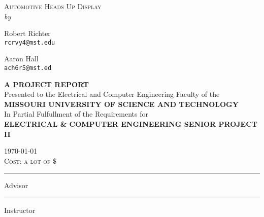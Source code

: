 \begin{titlepage}

\begin{center}
\textsc{\LARGE Automotive Heads Up Display} \\[2cm]

\textit{by} \\[0.5cm]

\begin{multicols}{2}
Robert Richter\\
\texttt{rcrvy4@mst.edu}\\

\columnbreak

Aaron Hall\\
\texttt{ach6r5@mst.ed}
\end{multicols}

\vspace{3 cm}

\textsc{\small \textbf{A PROJECT REPORT}} \\[0.5cm]
{\small Presented to the Electrical and Computer Engineering Faculty of the} \\[0.5cm]
\textsc{\small \textbf{MISSOURI UNIVERSITY OF SCIENCE AND TECHNOLOGY}} \\[0.5cm]
{\small In Partial Fulfullment of the Requirements for} \\[0.5cm]
\textsc{\small \textbf{ELECTRICAL \& COMPUTER ENGINEERING SENIOR PROJECT II}} \\[1cm]

\vfill

\textsc{\today} \\[3mm]
\textsc{Cost: a lot of \$} \\[2cm]

\begin{multicols}{2}
\hrule
\vspace{1mm}
Advisor\\
\columnbreak
\hrule
\vspace{1mm}
Instructor
\end{multicols}

\end{center}
\end{titlepage}